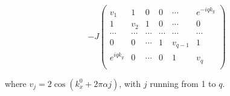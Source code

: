 \documentclass[a4paper,prb,10pt,aps,twocolumn]{revtex4-1}
\begin{document}
\begin{equation}
  \label{eq:27}
-J\begin{pmatrix}
    v_1 & 1 & 0 & 0 & \cdots & e^{-iqk_y}\\
    1 & v_2 & 1 & 0 & \cdots & 0\\
    \cdots & \cdots & \cdots & \cdots & \cdots & \cdots\\
    0 & 0 & \cdots & 1 & v_{q-1} & 1\\
    e^{i q k_y} & 0 & \cdots & 0 & 1 & v_q\\
  \end{pmatrix}
\end{equation}

where $v_j = 2\cos(k_x^0 + 2\pi \alpha j)$, with $j$ running from 1 to $q$.



\end{document}
